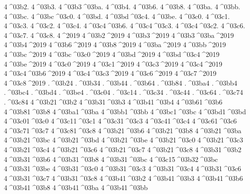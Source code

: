 {4^^^^03b2.
4^^^^03b3.
4^^^^03b3^^^^03ba.
4^^^^03b4.
4^^^^03b6.
4^^^^03b8.
4^^^^03ba.
4^^^^03bb.
4^^^^03bc.
4^^^^03bc^^^^03c0.
4^^^^03bd.
4^^^^03bd^^^^03c4.
4^^^^03be.
4^^^^03c0.
4^^^^03c1.
4^^^^03c3.
4^^^^03c2.
4^^^^03c4.
4^^^^03c4^^^^03b6.
4^^^^03c4^^^^03c3.
4^^^^03c4^^^^03c2.
4^^^^03c6.
4^^^^03c7.
4^^^^03c8.
4^^^^2019
4^^^^03b2^^^^2019
4^^^^03b3^^^^2019
4^^^^03b3^^^^03ba^^^^2019
4^^^^03b4^^^^2019
4^^^^03b6^^^^2019
4^^^^03b8^^^^2019
4^^^^03ba^^^^2019
4^^^^03bb^^^^2019
4^^^^03bc^^^^2019
4^^^^03bc^^^^03c0^^^^2019
4^^^^03bd^^^^2019
4^^^^03bd^^^^03c4^^^^2019
4^^^^03be^^^^2019
4^^^^03c0^^^^2019
4^^^^03c1^^^^2019
4^^^^03c3^^^^2019
4^^^^03c4^^^^2019
4^^^^03c4^^^^03b6^^^^2019
4^^^^03c4^^^^03c3^^^^2019
4^^^^03c6^^^^2019
4^^^^03c7^^^^2019
4^^^^03c8^^^^2019
.^^^^03b24
.^^^^03b34
.^^^^03b44
.^^^^03b64
.^^^^03b84
.^^^^03ba4
.^^^^03bb4
.^^^^03bc4
.^^^^03bd4
.^^^^03be4
.^^^^03c04
.^^^^03c14
.^^^^03c34
.^^^^03c44
.^^^^03c64
.^^^^03c74
.^^^^03c84
4^^^^03b21^^^^03b2
4^^^^03b31^^^^03b3
4^^^^03b41^^^^03b4
4^^^^03b61^^^^03b6
4^^^^03b81^^^^03b8
4^^^^03ba1^^^^03ba
4^^^^03bb1^^^^03bb
4^^^^03bc1^^^^03bc
4^^^^03bd1^^^^03bd
4^^^^03c01^^^^03c0
4^^^^03c11^^^^03c1
4^^^^03c31^^^^03c3
4^^^^03c41^^^^03c4
4^^^^03c61^^^^03c6
4^^^^03c71^^^^03c7
4^^^^03c81^^^^03c8
4^^^^03b21^^^^03b6
4^^^^03b21^^^^03b8
4^^^^03b21^^^^03ba
4^^^^03b21^^^^03bc
4^^^^03b21^^^^03bd
4^^^^03b21^^^^03be
4^^^^03b21^^^^03c0
4^^^^03b21^^^^03c3
4^^^^03b21^^^^03c4
4^^^^03b21^^^^03c6
4^^^^03b21^^^^03c7
4^^^^03b21^^^^03c8
4^^^^03b31^^^^03b2
4^^^^03b31^^^^03b6
4^^^^03b31^^^^03b8
4^^^^03b31^^^^03bc
4^^^^03c15^^^^03b32^^^^03bc %
4^^^^03b31^^^^03be
4^^^^03b31^^^^03c0
4^^^^03b31^^^^03c3
4^^^^03b31^^^^03c4
4^^^^03b31^^^^03c6
4^^^^03b31^^^^03c7
4^^^^03b31^^^^03c8
4^^^^03b41^^^^03b2
4^^^^03b41^^^^03b3
4^^^^03b41^^^^03b6
4^^^^03b41^^^^03b8
4^^^^03b41^^^^03ba
4^^^^03b41^^^^03bb 
}
